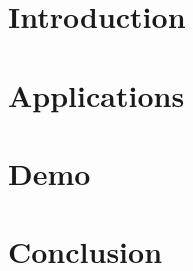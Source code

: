 \section[Intro]{Introduction}


\section[Apps]{Applications}



\section[Demo]{Demo}


\section[Concl]{Conclusion}
